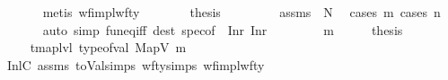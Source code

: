 \begin{isabellebody}
\ \ \ \ \ \ \isamarkupfalse%
\ {\isacharparenleft}{\kern0pt}metis\ wf{\isacharunderscore}{\kern0pt}impl{\isacharunderscore}{\kern0pt}wf{\isacharunderscore}{\kern0pt}ty{\isacharparenright}{\kern0pt}\isanewline
\ \ \ \ \isamarkupfalse%
\ \isamarkupfalse%
\ {\isacharquery}{\kern0pt}thesis\ \isanewline
\ \ \ \ \ \ \isamarkupfalse%
\ assms{\isacharparenleft}{\kern0pt}{}{\isacharcomma}{\kern0pt}{}{\isacharparenright}{\kern0pt}\ {}\ N\ \isamarkupfalse%
\ {\isacharparenleft}{\kern0pt}cases\ m{\isacharprime}{\kern0pt}{\isacharsemicolon}{\kern0pt}\ cases\ n{\isacharprime}{\kern0pt}{\isacharparenright}{\kern0pt}\isanewline
\ \ \ \ \ \ \isamarkupfalse%
\ {\isacharparenleft}{\kern0pt}auto\ simp{\isacharcolon}{\kern0pt}\ fun{\isacharunderscore}{\kern0pt}eq{\isacharunderscore}{\kern0pt}iff\ dest{\isacharcolon}{\kern0pt}\ spec{\isacharbrackleft}{\kern0pt}of\ {\isacharunderscore}{\kern0pt}\ {\isachardoublequoteopen}Inr\ {\isacharparenleft}{\kern0pt}Inr\ {\isacharunderscore}{\kern0pt}{\isacharparenright}{\kern0pt}{\isachardoublequoteclose}{\isacharbrackright}{\kern0pt}{\isacharparenright}{\kern0pt}\isanewline
\ \ \isamarkupfalse%
\isanewline
{}\isamarkupfalse%
\isanewline
\ \ \isamarkupfalse%
\ {\isacharparenleft}{\kern0pt}{}\ m{\isacharprime}{\kern0pt}{\isacharparenright}{\kern0pt}\isanewline
\ \ \isamarkupfalse%
\ \isamarkupfalse%
\ {\isacharquery}{\kern0pt}thesis\ \isanewline
\ \ \isamarkupfalse%
\ {\isacharminus}{\kern0pt}\isanewline
\ \ \ \ \isamarkupfalse%
\ {\isachardoublequoteopen}tmap{\isacharunderscore}{\kern0pt}lvl\ {\isacharparenleft}{\kern0pt}type{\isacharunderscore}{\kern0pt}of{\isacharunderscore}{\kern0pt}val\ {\isacharparenleft}{\kern0pt}MapV\ m{\isacharparenright}{\kern0pt}{\isacharparenright}{\kern0pt}\ {\isacharequal}{\kern0pt}\ {}{\isachardoublequoteclose}\isanewline
\ \ \ \ \ \ \isamarkupfalse%
\ {\isachardoublequoteopen}{}{\isachardoublequoteclose}\ InlC{}\ assms{\isacharparenleft}{\kern0pt}{}{\isacharparenright}{\kern0pt}\ toVal{}{}{}{}{\isachardot}{\kern0pt}simps{\isacharparenleft}{\kern0pt}{}{\isacharparenright}{\kern0pt}\ wf{\isacharunderscore}{\kern0pt}ty{\isachardot}{\kern0pt}simps{\isacharparenleft}{\kern0pt}{}{\isacharparenright}{\kern0pt}\ wf{\isacharunderscore}{\kern0pt}impl{\isacharunderscore}{\kern0pt}wf{\isacharunderscore}{\kern0pt}ty\ \isamarkupfalse%

\end{isabellebody}
